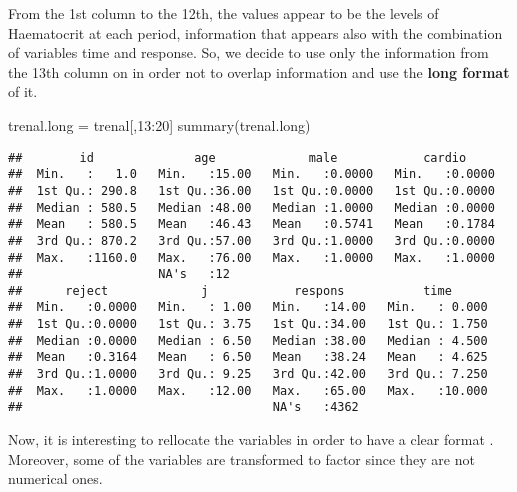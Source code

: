 \documentclass[
]{article}
\newenvironment{Shaded}{\begin{snugshade}}{\end{snugshade}}
\newcommand{\DecValTok}[1]{\textcolor[rgb]{0.00,0.00,0.81}{#1}}
\newcommand{\FunctionTok}[1]{\textcolor[rgb]{0.00,0.00,0.00}{#1}}
\newcommand{\NormalTok}[1]{#1}
\newcommand{\OtherTok}[1]{\textcolor[rgb]{0.56,0.35,0.01}{#1}}
\newcommand{\SpecialCharTok}[1]{\textcolor[rgb]{0.00,0.00,0.00}{#1}}
\begin{document}
From the 1st column to the 12th, the values appear to be the levels of
Haematocrit at each period, information that appears also with the
combination of variables time and response. So, we decide to use only
the information from the 13th column on in order not to overlap
information and use the \textbf{long format} of it.

\begin{Shaded}
\begin{Highlighting}[]
\NormalTok{trenal.long }\OtherTok{=}\NormalTok{ trenal[,}\DecValTok{13}\SpecialCharTok{:}\DecValTok{20}\NormalTok{]}
\FunctionTok{summary}\NormalTok{(trenal.long)}
\end{Highlighting}
\end{Shaded}

\begin{verbatim}
##        id              age             male            cardio      
##  Min.   :   1.0   Min.   :15.00   Min.   :0.0000   Min.   :0.0000  
##  1st Qu.: 290.8   1st Qu.:36.00   1st Qu.:0.0000   1st Qu.:0.0000  
##  Median : 580.5   Median :48.00   Median :1.0000   Median :0.0000  
##  Mean   : 580.5   Mean   :46.43   Mean   :0.5741   Mean   :0.1784  
##  3rd Qu.: 870.2   3rd Qu.:57.00   3rd Qu.:1.0000   3rd Qu.:0.0000  
##  Max.   :1160.0   Max.   :76.00   Max.   :1.0000   Max.   :1.0000  
##                   NA's   :12                                       
##      reject             j            respons           time       
##  Min.   :0.0000   Min.   : 1.00   Min.   :14.00   Min.   : 0.000  
##  1st Qu.:0.0000   1st Qu.: 3.75   1st Qu.:34.00   1st Qu.: 1.750  
##  Median :0.0000   Median : 6.50   Median :38.00   Median : 4.500  
##  Mean   :0.3164   Mean   : 6.50   Mean   :38.24   Mean   : 4.625  
##  3rd Qu.:1.0000   3rd Qu.: 9.25   3rd Qu.:42.00   3rd Qu.: 7.250  
##  Max.   :1.0000   Max.   :12.00   Max.   :65.00   Max.   :10.000  
##                                   NA's   :4362
\end{verbatim}

Now, it is interesting to rellocate the variables in order to have a
clear format . Moreover, some of the variables are transformed to factor
since they are not numerical ones.
\end{document}
